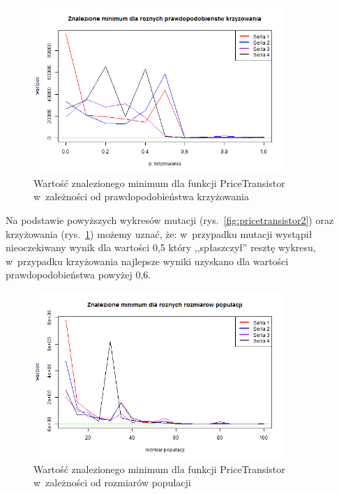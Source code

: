\documentclass[11pt, a4paper]{article}
\newcommand{\fbi}{\leavevmode{\parindent=1em\indent}}
\begin{document}
\begin{figure}[H]
	\begin{center}
		\includegraphics[width=0.85\textwidth]{./assets/PriceTransistor3.png}
		\caption{Wartość znalezionego minimum dla funkcji PriceTransistor w~zależności od prawdopodobieństwa krzyżowania}
		\label{fig:pricetransistor3}
	\end{center}
\end{figure}

\fbi
Na podstawie powyższych wykresów mutacji (rys.~\ref{fig:pricetransistor2}) oraz krzyżowania (rys.~\ref{fig:pricetransistor3}) możemy uznać, że: w~przypadku mutacji wystąpił nieoczekiwany wynik dla wartości 0,5 który ,,spłaszczył'' resztę wykresu, w~przypadku krzyżowania najlepsze wyniki uzyskano dla wartości prawdopodobieństwa powyżej 0,6.

\begin{figure}[H]
	\begin{center}
		\includegraphics[width=0.85\textwidth]{./assets/PriceTransistor4.png}
		\caption{Wartość znalezionego minimum dla funkcji PriceTransistor w~zależności od rozmiarów populacji}
		\label{fig:pricetransistor4}
	\end{center}
\end{figure}
\end{document}
